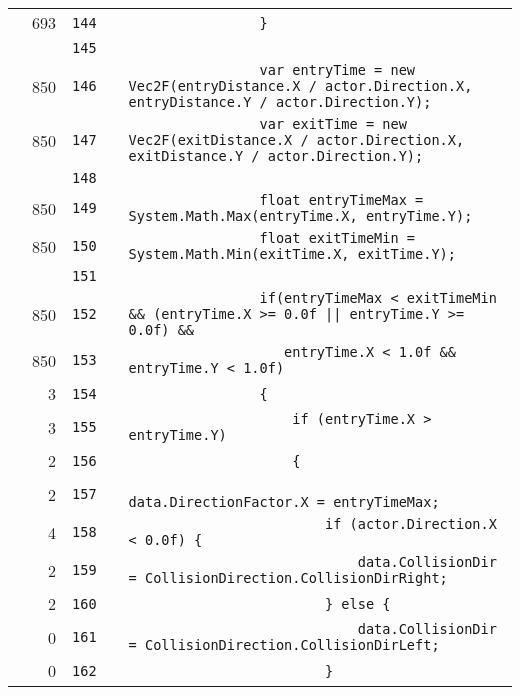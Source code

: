 \documentclass[a4paper,landscape,10pt]{article}
\begin{document}
\begin{longtable}[l]{lrrll}
\cellcolor{green} & 693 & \verb~144~ & & \verb~                }~\\
\cellcolor{gray} &  & \verb~145~ & & \verb~~\\
\cellcolor{green} & 850 & \verb~146~ & & \verb~                var entryTime = new Vec2F(entryDistance.X / actor.Direction.X, entryDistance.Y / actor.Direction.Y);~\\
\cellcolor{green} & 850 & \verb~147~ & & \verb~                var exitTime = new Vec2F(exitDistance.X / actor.Direction.X, exitDistance.Y / actor.Direction.Y);~\\
\cellcolor{gray} &  & \verb~148~ & & \verb~~\\
\cellcolor{green} & 850 & \verb~149~ & & \verb~                float entryTimeMax = System.Math.Max(entryTime.X, entryTime.Y);~\\
\cellcolor{green} & 850 & \verb~150~ & & \verb~                float exitTimeMin = System.Math.Min(exitTime.X, exitTime.Y);~\\
\cellcolor{gray} &  & \verb~151~ & & \verb~~\\
\cellcolor{green} & 850 & \verb~152~ & & \verb~                if(entryTimeMax < exitTimeMin && (entryTime.X >= 0.0f || entryTime.Y >= 0.0f) &&~\\
\cellcolor{green} & 850 & \verb~153~ & & \verb~                   entryTime.X < 1.0f && entryTime.Y < 1.0f)~\\
\cellcolor{green} & 3 & \verb~154~ & & \verb~                {~\\
\cellcolor{green} & 3 & \verb~155~ & & \verb~                    if (entryTime.X > entryTime.Y)~\\
\cellcolor{green} & 2 & \verb~156~ & & \verb~                    {~\\
\cellcolor{green} & 2 & \verb~157~ & & \verb~                        data.DirectionFactor.X = entryTimeMax;~\\
\cellcolor{orange} & 4 & \verb~158~ & & \verb~                        if (actor.Direction.X < 0.0f) {~\\
\cellcolor{green} & 2 & \verb~159~ & & \verb~                            data.CollisionDir = CollisionDirection.CollisionDirRight;~\\
\cellcolor{green} & 2 & \verb~160~ & & \verb~                        } else {~\\
\cellcolor{red} & 0 & \verb~161~ & & \verb~                            data.CollisionDir = CollisionDirection.CollisionDirLeft;~\\
\cellcolor{red} & 0 & \verb~162~ & & \verb~                        }~\\

\end{longtable}
\end{document}
